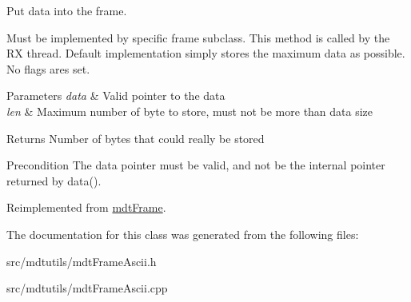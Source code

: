 Put data into the frame. 

Must be implemented by specific frame subclass. This method is called by the RX thread. Default implementation simply stores the maximum data as possible. No flags ares set. 
\begin{DoxyParams}{Parameters}
{\em data} & Valid pointer to the data \\
\hline
{\em len} & Maximum number of byte to store, must not be more than data size \\
\hline
\end{DoxyParams}
\begin{DoxyReturn}{Returns}
Number of bytes that could really be stored 
\end{DoxyReturn}
\begin{DoxyPrecond}{Precondition}
The data pointer must be valid, and not be the internal pointer returned by data(). 
\end{DoxyPrecond}


Reimplemented from \hyperlink{classmdt_frame_a51c355541b134e6e051167c70c09d531}{mdtFrame}.



The documentation for this class was generated from the following files:\begin{DoxyCompactItemize}
\item 
src/mdtutils/mdtFrameAscii.h\item 
src/mdtutils/mdtFrameAscii.cpp\end{DoxyCompactItemize}
